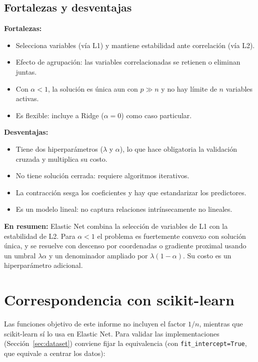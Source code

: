 \documentclass[11pt,a4paper]{article}
\newcommand{\resumen}[1]{\par\medskip\noindent\textbf{\color{acento}En resumen:} #1\par\medskip}
\theoremstyle{simple}
\begin{document}
\subsection{Fortalezas y desventajas}
\textbf{Fortalezas:}
\begin{itemize}
\item Selecciona variables (vía L1) y mantiene estabilidad ante correlación (vía L2).
\item Efecto de agrupación: las variables correlacionadas se retienen o eliminan juntas.
\item Con $\alpha<1$, la solución es única aun con $p\gg n$ y no hay límite de $n$ variables activas.
\item Es flexible: incluye a Ridge ($\alpha=0$) como caso particular.
\end{itemize}
\textbf{Desventajas:}
\begin{itemize}
\item Tiene dos hiperparámetros ($\lambda$ y $\alpha$), lo que hace obligatoria la validación cruzada y multiplica su costo.
\item No tiene solución cerrada: requiere algoritmos iterativos.
\item La contracción sesga los coeficientes y hay que estandarizar los predictores.
\item Es un modelo lineal: no captura relaciones intrínsecamente no lineales.
\end{itemize}

\resumen{Elastic Net combina la selección de variables de L1 con la estabilidad de L2. Para $\alpha<1$ el problema es fuertemente convexo con solución única, y se resuelve con descenso por coordenadas o gradiente proximal usando un umbral $\lambda\alpha$ y un denominador ampliado por $\lambda(1-\alpha)$. Su costo es un hiperparámetro adicional.}

\section{Correspondencia con scikit-learn}\label{sec:sklearn}
Las funciones objetivo de este informe no incluyen el factor $1/n$, mientras que scikit-learn \cite{pedregosa2011} sí lo usa en Elastic Net. Para validar las implementaciones (Sección~\ref{sec:dataset}) conviene fijar la equivalencia (con \texttt{fit\_intercept=True}, que equivale a centrar los datos):
\end{document}
